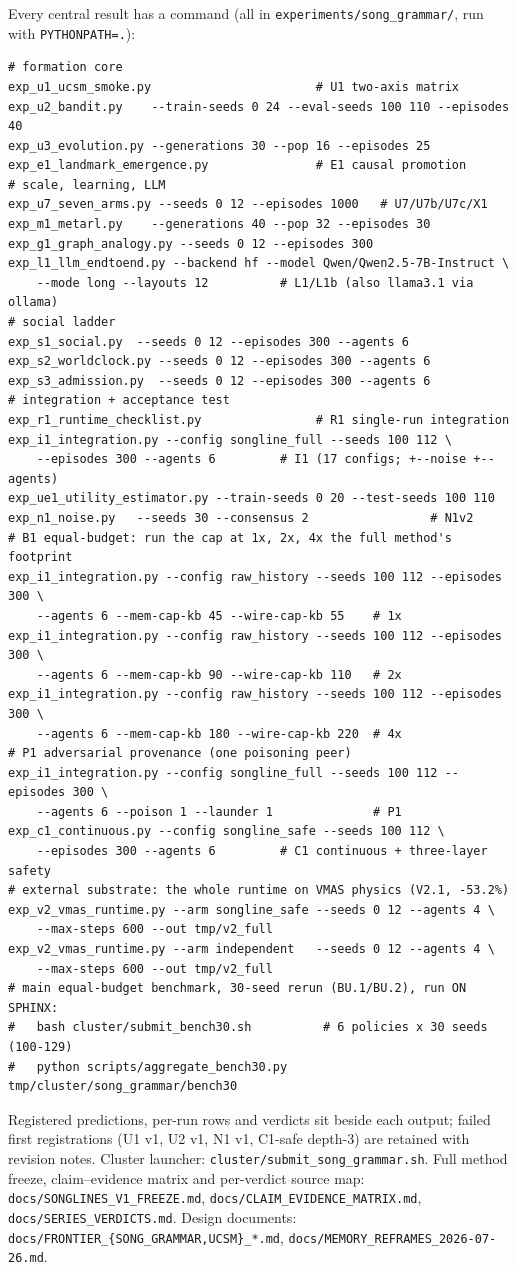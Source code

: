 \documentclass{article}
\begin{document}
\label{p5:app:repro}
Every central result has a command (all in
\texttt{experiments/song\_grammar/}, run with \texttt{PYTHONPATH=.}):
\begin{verbatim}
# formation core
exp_u1_ucsm_smoke.py                       # U1 two-axis matrix
exp_u2_bandit.py    --train-seeds 0 24 --eval-seeds 100 110 --episodes 40
exp_u3_evolution.py --generations 30 --pop 16 --episodes 25
exp_e1_landmark_emergence.py               # E1 causal promotion
# scale, learning, LLM
exp_u7_seven_arms.py --seeds 0 12 --episodes 1000   # U7/U7b/U7c/X1
exp_m1_metarl.py    --generations 40 --pop 32 --episodes 30
exp_g1_graph_analogy.py --seeds 0 12 --episodes 300
exp_l1_llm_endtoend.py --backend hf --model Qwen/Qwen2.5-7B-Instruct \
    --mode long --layouts 12          # L1/L1b (also llama3.1 via ollama)
# social ladder
exp_s1_social.py  --seeds 0 12 --episodes 300 --agents 6
exp_s2_worldclock.py --seeds 0 12 --episodes 300 --agents 6
exp_s3_admission.py  --seeds 0 12 --episodes 300 --agents 6
# integration + acceptance test
exp_r1_runtime_checklist.py                # R1 single-run integration
exp_i1_integration.py --config songline_full --seeds 100 112 \
    --episodes 300 --agents 6         # I1 (17 configs; +--noise +--agents)
exp_ue1_utility_estimator.py --train-seeds 0 20 --test-seeds 100 110
exp_n1_noise.py   --seeds 30 --consensus 2                 # N1v2
# B1 equal-budget: run the cap at 1x, 2x, 4x the full method's footprint
exp_i1_integration.py --config raw_history --seeds 100 112 --episodes 300 \
    --agents 6 --mem-cap-kb 45 --wire-cap-kb 55    # 1x
exp_i1_integration.py --config raw_history --seeds 100 112 --episodes 300 \
    --agents 6 --mem-cap-kb 90 --wire-cap-kb 110   # 2x
exp_i1_integration.py --config raw_history --seeds 100 112 --episodes 300 \
    --agents 6 --mem-cap-kb 180 --wire-cap-kb 220  # 4x
# P1 adversarial provenance (one poisoning peer)
exp_i1_integration.py --config songline_full --seeds 100 112 --episodes 300 \
    --agents 6 --poison 1 --launder 1              # P1
exp_c1_continuous.py --config songline_safe --seeds 100 112 \
    --episodes 300 --agents 6         # C1 continuous + three-layer safety
# external substrate: the whole runtime on VMAS physics (V2.1, -53.2%)
exp_v2_vmas_runtime.py --arm songline_safe --seeds 0 12 --agents 4 \
    --max-steps 600 --out tmp/v2_full
exp_v2_vmas_runtime.py --arm independent   --seeds 0 12 --agents 4 \
    --max-steps 600 --out tmp/v2_full
# main equal-budget benchmark, 30-seed rerun (BU.1/BU.2), run ON SPHINX:
#   bash cluster/submit_bench30.sh          # 6 policies x 30 seeds (100-129)
#   python scripts/aggregate_bench30.py tmp/cluster/song_grammar/bench30
\end{verbatim}
Registered predictions, per-run rows and verdicts sit beside each
output; failed first registrations (U1 v1, U2 v1, N1 v1, C1-safe
depth-3) are retained with revision notes. Cluster launcher:
\texttt{cluster/submit\_song\_grammar.sh}. Full method freeze,
claim--evidence matrix and per-verdict source map:
\texttt{docs/SONGLINES\_V1\_FREEZE.md},
\texttt{docs/CLAIM\_EVIDENCE\_MATRIX.md},
\texttt{docs/SERIES\_VERDICTS.md}. Design documents:
\texttt{docs/FRONTIER\_\{SONG\_GRAMMAR,UCSM\}\_*.md},
\texttt{docs/MEMORY\_REFRAMES\_2026-07-26.md}.
\end{document}

